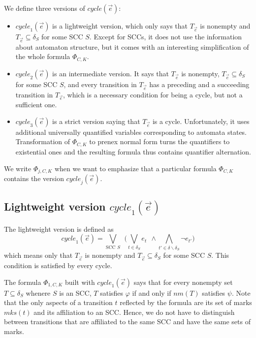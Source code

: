 \documentclass[runningheads]{llncs}
\newcommand{\mks}{\mathit{mks}}
\newcommand{\rem}{\mathit{nm}}
\newcommand{\mcycle}{\mathit{cycle}}
\newcommand{\Te}{T_{\vec{e}}}
\begin{document}
We define three versions of $\mcycle(\vec{e})$:
\begin{itemize}
\item $\mcycle_1(\vec{e})$ is a lightweight version, which only says
  that $\Te$ is nonempty and $\Te\subseteq\delta_S$ for some SCC $S$.
  Except for SCCs, it does not use the information about automaton
  structure, but it comes with an interesting simplification of the
  whole formula $\Phi_{C,K}$.
\item $\mcycle_2(\vec{e})$ is an intermediate version. It says that
  $\Te$ is nonempty, $\Te\subseteq\delta_S$ for some SCC $S$, and
  every transition in $\Te$ has %
  a preceding and a succeeding transition in $\Te$, which is a
  necessary condition for being a cycle, but not a sufficient one.
\item $\mcycle_3(\vec{e})$ is a strict version saying that $\Te$ is a
  cycle. Unfortunately, it uses additional universally quantified
  variables corresponding to automata states. Transformation of
  $\Phi_{C,K}$ to prenex normal form turns the quantifiers to
  existential ones and the resulting formula thus contains quantifier
  alternation.
\end{itemize}
We write $\Phi_{j,C,K}$ %
when we want to emphasize
that a particular formula $\Phi_{C,K}$ contains the version
$\mcycle_j(\vec{e})$.

\subsection{Lightweight version $\mcycle_1(\vec{e})$}
The lightweight version is defined as
\[
  \mcycle_1(\vec{e})=\bigvee_{\text{SCC } S}~~\big(\bigvee_{t\in\delta_S}e_t ~~\wedge \bigwedge_{t'\in\delta\smallsetminus\delta_S}\neg e_{t'}\big)
\]
which means only that $\Te$ is nonempty and $\Te\subseteq\delta_S$ for
some SCC $S$.
This condition is satisfied by every cycle.

The formula $\Phi_{1,C,K}$ built with $\mcycle_1(\vec{e})$ says that
for every nonempty set $T\subseteq\delta_S$ whenere $S$ is an SCC, $T$
satisfies $\varphi$ if and only if $\rem(T)$ satisfies $\psi$. Note
that the only aspects of a transition $t$ reflected by the formula are
its set of marks $\mks(t)$ and its affiliation to an SCC.
Hence, we do not have to distinguish between transitions that are
affiliated to the same SCC and have the same sets of marks.
\end{document}
